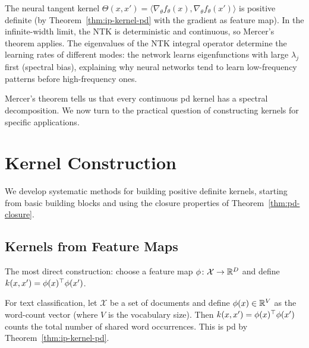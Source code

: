 \documentclass[11pt,a4paper]{article}
\begin{document}
\begin{rlconnection}[title={Mercer's Theorem and the NTK}]
The neural tangent kernel $\Theta(x, x') = \langle
\nabla_\theta f_\theta(x), \nabla_\theta f_\theta(x') \rangle$
is positive definite (by Theorem~\ref{thm:ip-kernel-pd} with
the gradient as feature map). In the infinite-width limit, the
NTK is deterministic and continuous, so Mercer's theorem applies.
The eigenvalues of the NTK integral operator determine the
learning rates of different modes: the network learns eigenfunctions
with large $\lambda_j$ first (spectral bias), explaining why
neural networks tend to learn low-frequency patterns before
high-frequency ones.
\end{rlconnection}

Mercer's theorem tells us that every continuous pd kernel has a
spectral decomposition. We now turn to the practical question of
constructing kernels for specific applications.


\section{Kernel Construction}
\label{sec:kernel-construction}

We develop systematic methods for building positive definite
kernels, starting from basic building blocks and using the closure
properties of Theorem~\ref{thm:pd-closure}.

\subsection{Kernels from Feature Maps}

The most direct construction: choose a feature map $\phi \colon
\mathcal{X} \to \mathbb{R}^D$ and define $k(x, x') = \phi(x)^\top
\phi(x')$.

\begin{example}
\label{ex:bow-kernel}
For text classification, let $\mathcal{X}$ be a set of documents
and define $\phi(x) \in \mathbb{R}^V$ as the word-count vector (where
$V$ is the vocabulary size). Then $k(x, x') = \phi(x)^\top
\phi(x')$ counts the total number of shared word occurrences.
This is pd by Theorem~\ref{thm:ip-kernel-pd}.
\end{example}
\end{document}
